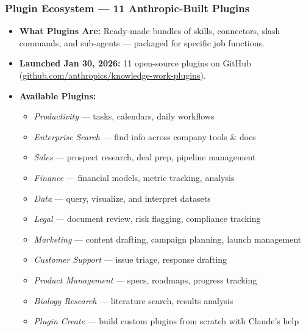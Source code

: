 \begin{frame}[fragile]\frametitle{Plugin Ecosystem — 11 Anthropic-Built Plugins}
  \begin{itemize}
    \item \textbf{What Plugins Are:} Ready-made bundles of skills, connectors, slash commands, and sub-agents — packaged for specific job functions.
    \item \textbf{Launched Jan 30, 2026:} 11 open-source plugins on GitHub (\href{https://github.com/anthropics/knowledge-work-plugins}{github.com/anthropics/knowledge-work-plugins}).
    \item \textbf{Available Plugins:}
      \begin{itemize}
        \item \textit{Productivity} — tasks, calendars, daily workflows
        \item \textit{Enterprise Search} — find info across company tools \& docs
        \item \textit{Sales} — prospect research, deal prep, pipeline management
        \item \textit{Finance} — financial models, metric tracking, analysis
        \item \textit{Data} — query, visualize, and interpret datasets
        \item \textit{Legal} — document review, risk flagging, compliance tracking
        \item \textit{Marketing} — content drafting, campaign planning, launch management
        \item \textit{Customer Support} — issue triage, response drafting
        \item \textit{Product Management} — specs, roadmaps, progress tracking
        \item \textit{Biology Research} — literature search, results analysis
        \item \textit{Plugin Create} — build custom plugins from scratch with Claude's help
      \end{itemize}
  \end{itemize}
\end{frame}

